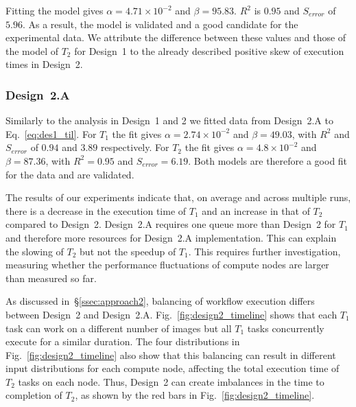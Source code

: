 Fitting the model gives $\alpha = 4.71 \times 10^{-2}$ and $\beta = 95.83$.
$R^{2}$ is $0.95$ and $S_{error}$ of $5.96$. As a result, the model is
validated and a good candidate for the experimental data. We attribute the
difference between these values and those of the model of $T_{2}$ for
Design~1 to the already described positive skew of execution times in
Design~2.

\subsubsection{Design~2.A} Similarly to the analysis in Design~1 and 2 we
fitted data from Design~2.A to Eq.~\ref{eq:des1_til}. For $T_{1}$ the fit
gives $\alpha=2.74\times10^{-2}$ and $\beta=49.03$, with $R^{2}$ and
$S_{error}$ of $0.94$ and $3.89$ respectively. For $T_{2}$ the fit gives
$\alpha=4.8\times10^{-2}$ and $\beta=87.36$, with $R^{2}=0.95$ and
$S_{error}=6.19$. Both models are therefore a good fit for the data and are
validated.



The results of our experiments indicate that, on average and across multiple
runs, there is a decrease in the execution time of $T_{1}$ and an increase in
that of $T_{2}$ compared to Design~2. Design~2.A requires one queue more than
Design~2 for $T_{1}$ and therefore more resources for Design~2.A
implementation. This can explain the slowing of $T_{2}$ but not the speedup
of $T_{1}$. This requires further investigation, measuring whether the
performance fluctuations of compute nodes are larger than measured so far.


As discussed in~\S\ref{ssec:approach2}, balancing of workflow execution
differs between Design~2 and Design~2.A. Fig.~\ref{fig:design2_timeline}
shows that each $T_{1}$ task can work on a different number of images but all
$T_{1}$ tasks concurrently execute for a similar duration. The four
distributions in Fig.~\ref{fig:design2_timeline} also show that this
balancing can result in different input distributions for each compute node,
affecting the total execution time of $T_{2}$ tasks on each node. Thus,
Design~2 can create imbalances in the time to completion of $T_{2}$, as shown
by the red bars in Fig.~\ref{fig:design2_timeline}.


